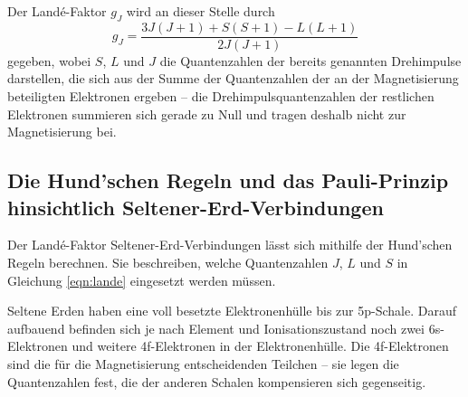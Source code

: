     Der Landé-Faktor $g_J$ wird an dieser Stelle durch 
    \begin{equation}
        g_J=\frac{3J(J+1)+S(S+1)-L(L+1)}{2J(J+1)}
        \label{eqn:lande}
    \end{equation}
    gegeben, wobei $S$, $L$ und $J$ die Quantenzahlen der bereits genannten Drehimpulse darstellen, die sich aus der Summe
    der Quantenzahlen der an der Magnetisierung beteiligten Elektronen ergeben -- 
    die Drehimpulsquantenzahlen der restlichen
    Elektronen summieren sich gerade zu Null und tragen deshalb nicht zur Magnetisierung bei. 

\subsection{Die Hund'schen Regeln und das Pauli-Prinzip hinsichtlich Seltener-Erd-Verbindungen}
\label{sub:wauwau}

    Der Landé-Faktor Seltener-Erd-Verbindungen lässt sich mithilfe der Hund'schen Regeln berechnen. 
    Sie beschreiben, welche Quantenzahlen $J$, $L$ und $S$ in Gleichung \eqref{eqn:lande} eingesetzt werden müssen. 

    Seltene Erden haben eine voll besetzte Elektronenhülle bis zur 5p-Schale. Darauf aufbauend befinden sich je nach 
    Element und Ionisationszustand noch zwei 6s-Elektronen und weitere 4f-Elektronen in der Elektronenhülle. 
    Die 4f-Elektronen sind die für die Magnetisierung entscheidenden Teilchen -- sie legen die Quantenzahlen fest, 
    die der anderen Schalen kompensieren sich gegenseitig. 

